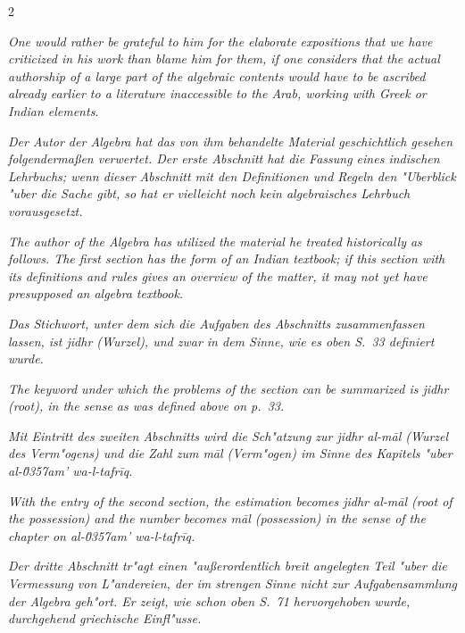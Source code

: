 \documentclass[10pt,a4paper]{article}
\begin{document}
\begin{paracol}{2}
\switchcolumn

\textit{One would rather be grateful to him for the elaborate expositions that we have criticized in his work than blame him for them, if one considers that the actual authorship of a large part of the algebraic contents would have to be ascribed already earlier to a literature inaccessible to the Arab, working with Greek or Indian elements.}

\switchcolumn*

\textit{Der Autor der \textit{Algebra} hat das von ihm behandelte Material geschichtlich gesehen folgenderma\ss{}en verwertet. Der erste Abschnitt hat die Fassung eines indischen Lehrbuchs; wenn dieser Abschnitt mit den Definitionen und Regeln den "Uberblick "uber die Sache gibt, so hat er vielleicht noch kein algebraisches Lehrbuch vorausgesetzt.}

\switchcolumn

\textit{The author of the \textit{Algebra} has utilized the material he treated historically as follows. The first section has the form of an Indian textbook; if this section with its definitions and rules gives an overview of the matter, it may not yet have presupposed an algebra textbook.}

\switchcolumn*

\textit{Das Stichwort, unter dem sich die Aufgaben des Abschnitts zusammenfassen lassen, ist \textit{jidhr} (Wurzel), und zwar in dem Sinne, wie es oben S.\ 33 definiert wurde.}

\switchcolumn

\textit{The keyword under which the problems of the section can be summarized is \textit{jidhr} (root), in the sense as was defined above on p.\ 33.}

\switchcolumn*

\textit{Mit Eintritt des zweiten Abschnitts wird die Sch"atzung zur \textit{jidhr al-m\=al} (Wurzel des Verm"ogens) und die Zahl zum \textit{m\=al} (Verm"ogen) im Sinne des Kapitels "uber \textit{al-\u0357{}am' wa-l-tafr\={i}q}.}

\switchcolumn

\textit{With the entry of the second section, the estimation becomes \textit{jidhr al-m\=al} (root of the possession) and the number becomes \textit{m\=al} (possession) in the sense of the chapter on \textit{al-\u0357{}am' wa-l-tafr\={i}q}.}

\switchcolumn*

\textit{Der dritte Abschnitt tr"agt einen "au\ss{}erordentlich breit angelegten Teil "uber die Vermessung von L"andereien, der im strengen Sinne nicht zur Aufgabensammlung der Algebra geh"ort. Er zeigt, wie schon oben S.\ 71 hervorgehoben wurde, durchgehend griechische Einfl"usse.}


\end{paracol}
\end{document}
